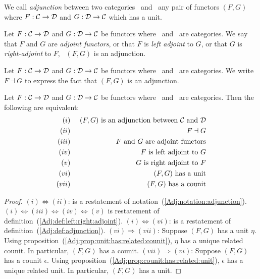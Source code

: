 \begin{defin}\label{Adj:def:adjunction}
    We call {\em adjunction} between two categories \Cat\ and \Dat\ any
    pair of functors $(F,G)$ where $F:\mbox{$\cal C$}\to\mbox{$\cal D$}$ and $G:\mbox{$\cal D$}\to\mbox{$\cal C$}$ which 
    has a unit.
\end{defin}

\begin{defin}\label{Adj:def:left:right:adjoint}
    Let $F:\mbox{$\cal C$}\to\mbox{$\cal D$}$ and $G:\mbox{$\cal D$}\to\mbox{$\cal C$}$ be functors where \Cat\ and \Dat\ 
    are categories. We say that $F$ and $G$ are {\em adjoint functors}, 
    or that $F$ is {\em left adjoint} to $G$, or that $G$ is {\em right-adjoint}
    to $F$, \ifand\ $(F,G)$ is an adjunction.
\end{defin}

\begin{notation}\label{Adj:notation:adjunction}
    Let $F:\mbox{$\cal C$}\to\mbox{$\cal D$}$ and $G:\mbox{$\cal D$}\to\mbox{$\cal C$}$ be functors where \Cat\ and \Dat\ 
    are categories. We write $F\dashv G$ to express the fact that $(F,G)$
    is an adjunction.
\end{notation}

\begin{prop}\label{Adj:prop:adjunction:TFAE}
    Let $F:\mbox{$\cal C$}\to\mbox{$\cal D$}$ and $G:\mbox{$\cal D$}\to\mbox{$\cal C$}$ be functors where \Cat\ and \Dat\ 
    are categories. Then the following are equivalent:
        \begin{eqnarray*}
            (i)&\ &\mbox{$(F,G)$ is an adjunction between \Cat\ and \Dat}\\
            (ii)&\ &F\dashv G\\
            (iii)&\ &\mbox{$F$ and $G$ are adjoint functors}\\
            (iv)&\ &\mbox{$F$ is left adjoint to $G$}\\
            (v)&\ &\mbox{$G$ is right adjoint to $F$}\\
            (vi)&\ &\mbox{$(F,G)$ has a unit}\\
            (vii)&\ &\mbox{$(F,G)$ has a counit}\\
        \end{eqnarray*}
\end{prop}
\begin{proof}
    $(i)\Leftrightarrow (ii)$: is a restatement of notation~(\ref{Adj:notation:adjunction}).
    \newline\noindent
    $(i)\Leftrightarrow (iii)\Leftrightarrow (iv)\Leftrightarrow (v)$ is restatement
    of definition~(\ref{Adj:def:left:right:adjoint}).
    \newline\noindent
    $(i)\Leftrightarrow (vi)$: is a restatement of 
    definition~(\ref{Adj:def:adjunction}).
    \newline\noindent
    $(vi)\Rightarrow(vii)$: Suppose $(F,G)$ has a unit $\eta$. Using
    proposition~(\ref{Adj:prop:unit:has:related:counit}), $\eta$ has a unique
    related counit. In particular, $(F,G)$ has a counit.
    \newline\noindent
    $(vii)\Rightarrow(vi)$: Suppose $(F,G)$ has a counit $\epsilon$. Using
    proposition~(\ref{Adj:prop:counit:has:related:unit}), $\epsilon$ has a unique
    related unit. In particular, $(F,G)$ has a unit.
\end{proof}

